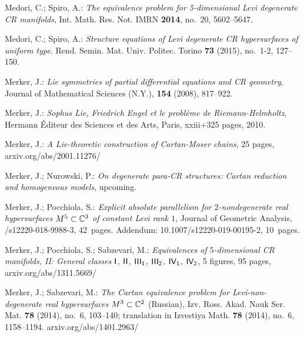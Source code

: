 \begin{thebibliography}{XL}
{\smallskip

Medori, C.; Spiro, A.: 
{\em The equivalence problem for 5-dimensional Levi degenerate 
CR manifolds}, Int. Math. Res. Not. IMRN {\bf 2014},
no.~20, 5602--5647. 

\smallskip

Medori, C.; Spiro, A.:
{\em Structure equations of Levi degenerate CR hypersurfaces 
of uniform type}. 
Rend. Semin. Mat. Univ. Politec. Torino {\bf 73} (2015), 
no.~1-2, 127--150. 

\smallskip

Merker, J.:
{\em Lie symmetries of partial differential equations
and CR geometry}, Journal of Mathematical
Sciences (N.Y.), {\bf 154} (2008), 817--922.

\smallskip

Merker, J.:
{\em Sophus Lie, Friedrich Engel et le probl\`eme 
de Riemann-Helmholtz},
Hermann \'Editeur des Sciences et des Arts, Paris, xxiii+325 pages,
2010.

\smallskip

Merker, J.:
{\em A Lie-theoretic construction of Cartan-Moser chains},
25 pages, {\tiny\sf arxiv.org/abs/2001.11276/}

\smallskip

Merker, J.; Nurowski, P.:
{\em On degenerate para-CR structures:
Cartan reduction and homogeneous models},
upcoming.

\smallskip

Merker, J.; Pocchiola, S.:
{\em Explicit absolute parallelism for $2$-nondegenerate real
hypersurfaces $M^5 \subset \mathbb{C}^3$ of constant Levi rank $1$},
Journal of Geometric Analysis, 
{\tiny{}/s12220-018-9988-3}, 
42~pages. Addendum: 10.1007/s12220-019-00195-2, 10~pages.

\smallskip

Merker, J.; Pocchiola, S.; Sabzevari, M.:
{\em Equivalences of $5$-dimensional CR manifolds, II: 
General classes 
$\text{\sf I}$,
$\text{\sf II}$, 
$\text{\sf III}_{\text{\sf 1}}$,
$\text{\sf III}_{\text{\sf 2}}$,
$\text{\sf IV}_{\text{\sf 1}}$,
$\text{\sf IV}_{\text{\sf 2}}$},
5 figures, 95 pages, {\tiny\sf arxiv.org/abs/1311.5669/}

\smallskip

Merker, J.; Sabzevari, M.:
{\em The Cartan equivalence problem for Levi-non-degenerate
real hypersurfaces $M^3 \subset \mathbb{C}^2$}
(Russian), Izv. Ross. Akad. Nauk Ser. Mat. {\bf 78}
(2014), no.~6, 103--140; translation in
Izvestiya Math. {\bf 78} (2014), no.~6, 1158--1194. 
{\tiny\sf arxiv.org/abs/1401.2963/}

}
\end{thebibliography}
